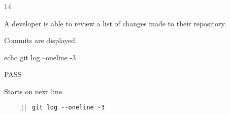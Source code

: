 \begin{description}[align=right,leftmargin=3.2cm,labelindent=3.0cm]
\item[Step:] 14
\item[Confirm:] A developer is able to review a list of changes made to their repository.
\item[Expectation:] Commits are displayed.
\item[Command:] echo git  log --oneline -3
\item[Test Result:] PASS
\item[Evidence:] Starts on next line.
\end{description}
\begin{lstlisting}[numbers=left]
git log --oneline -3

\end{lstlisting}
